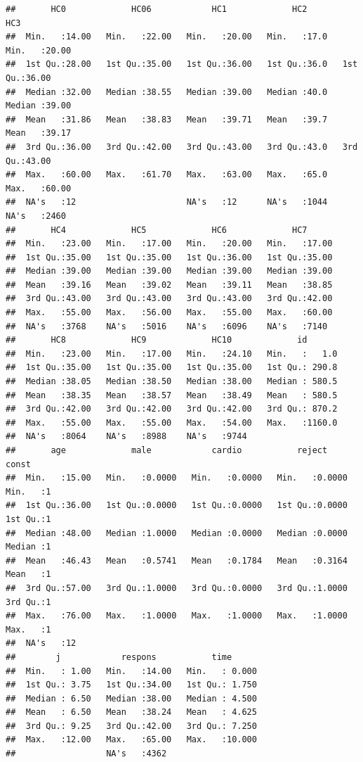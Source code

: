 \documentclass[
]{article}
\begin{document}
\begin{verbatim}
##       HC0             HC06            HC1             HC2            HC3       
##  Min.   :14.00   Min.   :22.00   Min.   :20.00   Min.   :17.0   Min.   :20.00  
##  1st Qu.:28.00   1st Qu.:35.00   1st Qu.:36.00   1st Qu.:36.0   1st Qu.:36.00  
##  Median :32.00   Median :38.55   Median :39.00   Median :40.0   Median :39.00  
##  Mean   :31.86   Mean   :38.83   Mean   :39.71   Mean   :39.7   Mean   :39.17  
##  3rd Qu.:36.00   3rd Qu.:42.00   3rd Qu.:43.00   3rd Qu.:43.0   3rd Qu.:43.00  
##  Max.   :60.00   Max.   :61.70   Max.   :63.00   Max.   :65.0   Max.   :60.00  
##  NA's   :12                      NA's   :12      NA's   :1044   NA's   :2460   
##       HC4             HC5             HC6             HC7       
##  Min.   :23.00   Min.   :17.00   Min.   :20.00   Min.   :17.00  
##  1st Qu.:35.00   1st Qu.:35.00   1st Qu.:36.00   1st Qu.:35.00  
##  Median :39.00   Median :39.00   Median :39.00   Median :39.00  
##  Mean   :39.16   Mean   :39.02   Mean   :39.11   Mean   :38.85  
##  3rd Qu.:43.00   3rd Qu.:43.00   3rd Qu.:43.00   3rd Qu.:42.00  
##  Max.   :55.00   Max.   :56.00   Max.   :55.00   Max.   :60.00  
##  NA's   :3768    NA's   :5016    NA's   :6096    NA's   :7140   
##       HC8             HC9             HC10             id        
##  Min.   :23.00   Min.   :17.00   Min.   :24.10   Min.   :   1.0  
##  1st Qu.:35.00   1st Qu.:35.00   1st Qu.:35.00   1st Qu.: 290.8  
##  Median :38.05   Median :38.50   Median :38.00   Median : 580.5  
##  Mean   :38.35   Mean   :38.57   Mean   :38.49   Mean   : 580.5  
##  3rd Qu.:42.00   3rd Qu.:42.00   3rd Qu.:42.00   3rd Qu.: 870.2  
##  Max.   :55.00   Max.   :55.00   Max.   :54.00   Max.   :1160.0  
##  NA's   :8064    NA's   :8988    NA's   :9744                    
##       age             male            cardio           reject           const  
##  Min.   :15.00   Min.   :0.0000   Min.   :0.0000   Min.   :0.0000   Min.   :1  
##  1st Qu.:36.00   1st Qu.:0.0000   1st Qu.:0.0000   1st Qu.:0.0000   1st Qu.:1  
##  Median :48.00   Median :1.0000   Median :0.0000   Median :0.0000   Median :1  
##  Mean   :46.43   Mean   :0.5741   Mean   :0.1784   Mean   :0.3164   Mean   :1  
##  3rd Qu.:57.00   3rd Qu.:1.0000   3rd Qu.:0.0000   3rd Qu.:1.0000   3rd Qu.:1  
##  Max.   :76.00   Max.   :1.0000   Max.   :1.0000   Max.   :1.0000   Max.   :1  
##  NA's   :12                                                                    
##        j            respons           time       
##  Min.   : 1.00   Min.   :14.00   Min.   : 0.000  
##  1st Qu.: 3.75   1st Qu.:34.00   1st Qu.: 1.750  
##  Median : 6.50   Median :38.00   Median : 4.500  
##  Mean   : 6.50   Mean   :38.24   Mean   : 4.625  
##  3rd Qu.: 9.25   3rd Qu.:42.00   3rd Qu.: 7.250  
##  Max.   :12.00   Max.   :65.00   Max.   :10.000  
##                  NA's   :4362
\end{verbatim}
\end{document}
